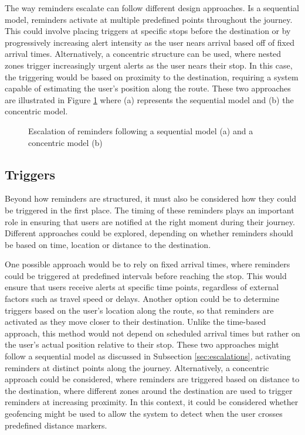 The way reminders escalate can follow different design approaches. 
Is a sequential model, reminders activate at multiple predefined points throughout the journey. 
This could involve placing triggers at specific stops before the destination or by progressively increasing alert intensity as the user nears arrival based off of fixed arrival times.
Alternatively, a concentric structure can be used, where nested zones trigger increasingly urgent alerts as the user nears their stop.
In this case, the triggering would be based on proximity to the destination, requiring a system capable of estimating the user's position along the route. 
These two approaches are illustrated in Figure \ref{fig:reminderescalation} where (a) represents the sequential model and (b) the concentric model.

\begin{figure}[H]%
    \centering
    \qquad
    \caption{Escalation of reminders following a sequential model (a) and a concentric model (b)}%
    \label{fig:reminderescalation}%
\end{figure}

\subsection{Triggers}
Beyond how reminders are structured, it must also be considered how they could be triggered in the first place. 
The timing of these reminders plays an important role in ensuring that users are notified at the right moment during their journey. 
Different approaches could be explored, depending on whether reminders should be based on time, location or distance to the destination.

One possible approach would be to rely on fixed arrival times, where reminders could be triggered at predefined intervals before reaching the stop.
This would ensure that users receive alerts at specific time points, regardless of external factors such as travel speed or delays. 
Another option could be to determine triggers based on the user's location along the route, so that reminders are activated as they move closer to their destination. 
Unlike the time-based approach, this method would not depend on scheduled arrival times but rather on the user's actual position relative to their stop.
These two approaches might follow a sequential model as discussed in Subsection \ref{sec:escalations}, activating reminders at distinct points along the journey. 
Alternatively, a concentric approach could be considered, where reminders are triggered based on distance to the destination, where different zones around the destination are used to trigger reminders at increasing proximity.
In this context, it could be considered whether geofencing might be used to allow the system to detect when the user crosses predefined distance markers.

